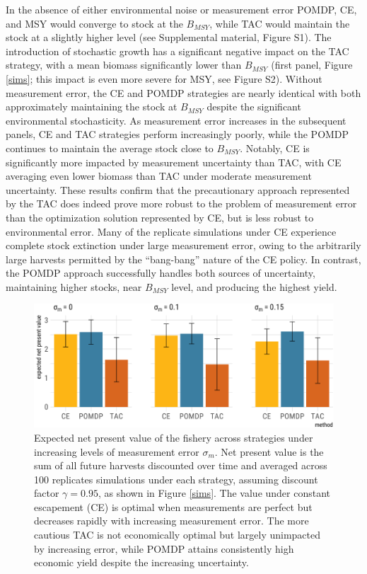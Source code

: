 \documentclass[3p]{elsarticle} %
\makeatletter
\def\maxwidth{\ifdim\Gin@nat@width>\linewidth\linewidth
\else\Gin@nat@width\fi}
\let\Oldincludegraphics\includegraphics
\renewcommand{\includegraphics}[1]{\Oldincludegraphics[width=\maxwidth]{#1}}
\makeatother
\begin{document}
In the absence of either environmental noise or measurement error POMDP,
CE, and MSY would converge to stock at the \(B_{MSY}\), while TAC would
maintain the stock at a slightly higher level (see Supplemental
material, Figure S1). The introduction of stochastic growth has a
significant negative impact on the TAC strategy, with a mean biomass
significantly lower than \(B_{MSY}\) (first panel, Figure \ref{sims};
this impact is even more severe for MSY, see Figure S2). Without
measurement error, the CE and POMDP strategies are nearly identical with
both approximately maintaining the stock at \(B_{MSY}\) despite the
significant environmental stochasticity. As measurement error increases
in the subsequent panels, CE and TAC strategies perform increasingly
poorly, while the POMDP continues to maintain the average stock close to
\(B_{MSY}\). Notably, CE is significantly more impacted by measurement
uncertainty than TAC, with CE averaging even lower biomass than TAC
under moderate measurement uncertainty. These results confirm that the
precautionary approach represented by the TAC does indeed prove more
robust to the problem of measurement error than the optimization
solution represented by CE, but is less robust to environmental error.
Many of the replicate simulations under CE experience complete stock
extinction under large measurement error, owing to the arbitrarily large
harvests permitted by the ``bang-bang'' nature of the CE policy. In
contrast, the POMDP approach successfully handles both sources of
uncertainty, maintaining higher stocks, near \(B_{MSY}\) level, and
producing the highest yield.

\begin{figure}
\centering
\includegraphics{manuscript_files/figure-latex/econ-1.pdf}
\caption{Expected net present value of the fishery across strategies
under increasing levels of measurement error \(\sigma_m\). Net present
value is the sum of all future harvests discounted over time and
averaged across 100 replicates simulations under each strategy, assuming
discount factor \(\gamma = 0.95\), as shown in Figure \ref{sims}. The
value under constant escapement (CE) is optimal when measurements are
perfect but decreases rapidly with increasing measurement error. The
more cautious TAC is not economically optimal but largely unimpacted by
increasing error, while POMDP attains consistently high economic yield
despite the increasing uncertainty. \label{econ}}
\end{figure}
\end{document}
